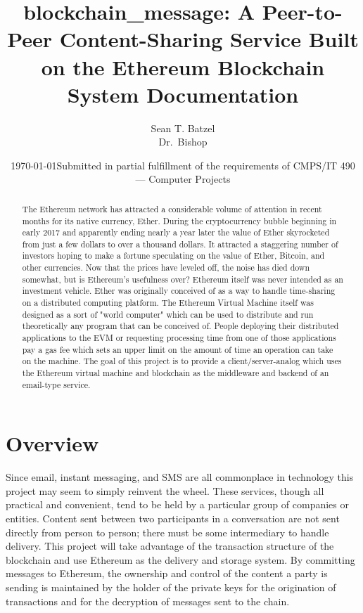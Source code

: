 \documentclass[titlepage]{report}
\title{blockchain\_message: A Peer-to-Peer Content-Sharing Service Built on the Ethereum Blockchain\\\large{System Documentation}}
\author{Sean T. Batzel\\Dr.\ Bishop}
\date{\today\endgraf\bigskip Submitted in partial fulfillment of the requirements of CMPS/IT 490 --- Computer Projects}
\begin{document}
\maketitle

\tableofcontents

\nocite{*}

\begin{abstract}
The Ethereum network has attracted a considerable volume of attention in recent months for its native currency, Ether.\cite{ethereum} During the cryptocurrency bubble beginning in early 2017 and apparently ending nearly a year later the value of Ether skyrocketed from just a few dollars to over a thousand dollars. It attracted a staggering number of investors hoping to make a fortune speculating on the value of Ether, Bitcoin, and other currencies. Now that the prices have leveled off, the noise has died down somewhat, but is Ethereum's usefulness over? Ethereum itself was never intended as an investment vehicle. Ether was originally conceived of as a way to handle time-sharing on a distributed computing platform. The Ethereum Virtual Machine itself was designed as a sort of "world computer" which can be used to distribute and run theoretically any program that can be conceived of. People deploying their distributed applications to the EVM or requesting processing time from one of those applications pay a \gls{gas} fee which sets an upper limit on the amount of time an operation can take on the machine.\cite{yellowpaper} The goal of this project is to provide a client/server-analog which uses the Ethereum virtual machine and \gls{blockchain} as the middleware and backend of an email-type service.
\end{abstract}

\chapter{Overview}

Since email, instant messaging, and SMS are all commonplace in technology this project may seem to simply reinvent the wheel. These services, though all practical and convenient, tend to be held by a particular group of companies or entities. Content sent between two participants in a conversation are not sent directly from person to person; there must be some intermediary to handle delivery. This project will take advantage of the transaction structure of the blockchain and use Ethereum as the delivery and storage system. By committing messages to Ethereum, the ownership and control of the content a party is sending is maintained by the holder of the private keys for the origination of transactions and for the decryption of messages sent to the chain.\\
\end{document}
